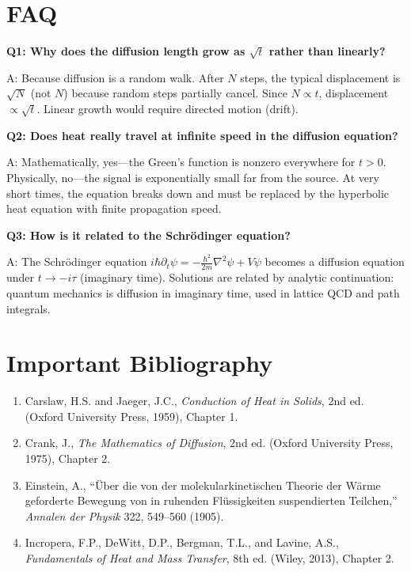 \documentclass[11pt,openright]{book}
\begin{document}
\section*{FAQ}

\textbf{Q1: Why does the diffusion length grow as $\sqrt{t}$ rather than linearly?}

A: Because diffusion is a random walk. After $N$ steps, the typical displacement is $\sqrt{N}$ (not $N$) because random steps partially cancel. Since $N \propto t$, displacement $\propto \sqrt{t}$. Linear growth would require directed motion (drift).

\textbf{Q2: Does heat really travel at infinite speed in the diffusion equation?}

A: Mathematically, yes---the Green's function is nonzero everywhere for $t > 0$. Physically, no---the signal is exponentially small far from the source. At very short times, the equation breaks down and must be replaced by the hyperbolic heat equation with finite propagation speed.

\textbf{Q3: How is it related to the Schr\"odinger equation?}

A: The Schr\"odinger equation $i\hbar \partial_t \psi = -\frac{\hbar^2}{2m}\nabla^2 \psi + V\psi$ becomes a diffusion equation under $t \to -i\tau$ (imaginary time). Solutions are related by analytic continuation: quantum mechanics is diffusion in imaginary time, used in lattice QCD and path integrals.
\section*{Important Bibliography}

\begin{enumerate}
\item Carslaw, H.S. and Jaeger, J.C., \textit{Conduction of Heat in Solids}, 2nd ed. (Oxford University Press, 1959), Chapter 1.
\item Crank, J., \textit{The Mathematics of Diffusion}, 2nd ed. (Oxford University Press, 1975), Chapter 2.
\item Einstein, A., ``\"Uber die von der molekularkinetischen Theorie der W\"arme geforderte Bewegung von in ruhenden Fl\"ussigkeiten suspendierten Teilchen,'' \textit{Annalen der Physik} 322, 549--560 (1905).
\item Incropera, F.P., DeWitt, D.P., Bergman, T.L., and Lavine, A.S., \textit{Fundamentals of Heat and Mass Transfer}, 8th ed. (Wiley, 2013), Chapter 2.
\end{enumerate}
\end{document}
